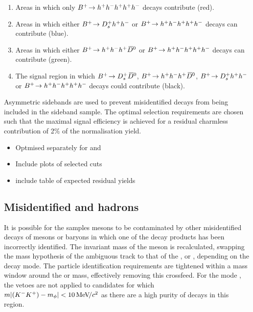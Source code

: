 \begin{enumerate}
\item Areas in which only ${{{B}^+}}\!\rightarrow h^{+}h^{-}h^{+}h^{+}h^{-}$ decays contribute (red).
\item Areas in which either ${{{B}^+}}\!\rightarrow D_{s}^{+}h^{+}h^{-}$  or ${{{B}^+}}\!\rightarrow h^{+}h^{-}h^{+} h^{+}h^{-}$ decays can contribute (blue). 

\item Areas in which either ${{{B}^+}}\!\rightarrow h^{+}h^{-}h^{+}{{\kern 0.2em\overline{\kern -0.2em D}{}}{}^0}$ or ${{{B}^+}}\!\rightarrow h^{+}h^{-}h^{+} h^{+}h^{-}$ decays can contribute (green). 
\item The signal region in which ${{{B}^+}}\!\rightarrow D_{s}^{+} {{\kern 0.2em\overline{\kern -0.2em D}{}}{}^0}$, ${{{B}^+}}\!\rightarrow h^{+}h^{-}h^{+}{{\kern 0.2em\overline{\kern -0.2em D}{}}{}^0}$, ${{{B}^+}}\!\rightarrow D_{s}^{+}h^{+}h^{-}$ or ${{{B}^+}}\!\rightarrow h^{+}h^{-}h^{+}h^{+}h^{-}$ decays could contribute (black).
\end{enumerate}   

Asymmetric \Dzb sidebands are used to prevent misidentified \decay{\Bp}{\Dsp (\decay{\Dzb}{\Km\pip})} decays from being included in the sideband sample.
The optimal selection requirements are chosen such that the maximal signal efficiency is achieved for a residual charmless contribution of 2\% of the normalisation yield.


{\color{Red}
\begin{itemize}
\item Optmised separately for \decay{\Bp}{\Dsp\Kp\Km} and \decay{\Bp}{\Dsp\phiz}
\item Include plots of selected cuts
\item include table of expected residual yields 
\end{itemize}
}


\subsection{Misidentified \D and \Lc hadrons}
\label{sec:pidvetos}

It is possible for the samples \Dsp mesons to be contaminated by other misidentified decays of \Dp mesons or \Lc baryons in which one of the decay products has been incorrectly identified.
The invariant mass of the \Dsp meson is recalculated, swapping the mass hypothesis of the ambiguous track to that of the \kaon, or \proton, depending on the decay mode. 
The particle identification requirements are tightened within a mass window around the \Dp or \Lc mass, effectively removing this crossfeed. For the mode \decay{\Dsp}{\Kp\Km\pip}, the vetoes are not applied to candidates for which $m|({{K}^-}{{K}^+})-m_{\phi}| < 10{\mathrm{\,Me\kern -0.1em V\!/}c^2}$ as there are a high purity of \decay{\Dsp}{\Kp\Km\pip} decays in this region.

